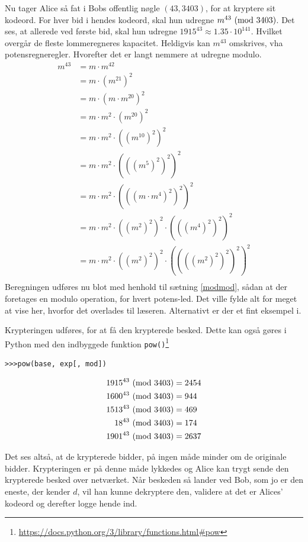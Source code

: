 Nu tager Alice så fat i Bobs offentlig nøgle \((43, 3403)\), for at kryptere sit kodeord.
For hver bid i hendes kodeord, skal hun udregne \(m^{43} \ (\mathrm{mod}\ 3403)\).
Det ses, at allerede ved første bid, skal hun udregne \(1915^{43} \approx 1.35 \cdot 10^{141}\).
Hvilket overgår de fleste lommeregneres kapacitet.
Heldigvis kan \(m^{43}\) omskrives, vha potensregneregler. Hvorefter det er langt nemmere at udregne modulo.
\begin{align*}
    m^{43} &= m \cdot m^{42}\\
    &= m \cdot (m^{21})^2\\
    &= m \cdot (m \cdot m^{20})^2\\
    &= m \cdot m^2 \cdot (m^{20})^2\\
    &= m \cdot m^2 \cdot ((m^{10})^2)^2\\
    &= m \cdot m^2 \cdot (((m^5)^2)^2)^2\\
    &= m \cdot m^2 \cdot (((m \cdot m^4)^2)^2)^2\\
    &= m \cdot m^2 \cdot ((m^2)^2)^2 \cdot (((m^4)^2)^2)^2\\
    &= m \cdot m^2 \cdot ((m^2)^2)^2 \cdot ((((m^2)^2)^2)^2)^2\\
\end{align*}
Beregningen udføres nu blot med henhold til sætning \ref{modmod}, sådan at der foretages en modulo operation, for hvert potens-led.
Det ville fylde alt for meget at vise her, hvorfor det overlades til læseren. Alternativt er der et fint eksempel i. \cite[104]{krypto}
\par
Krypteringen udføres, for at få den krypterede besked.
Dette kan også gøres i Python med den indbyggede funktion \texttt{pow()}\footnote{\url{https://docs.python.org/3/library/functions.html\#pow}}
\begin{verbatim}
>>>pow(base, exp[, mod])
\end{verbatim}

\begin{align*}
    1915^{43} \ (\mathrm{mod}\ 3403) &= 2454\\
    1600^{43} \ (\mathrm{mod}\ 3403) &= 944\\
    1513^{43} \ (\mathrm{mod}\ 3403) &= 469\\
    18^{43} \ (\mathrm{mod}\ 3403)   &= 174\\
    1901^{43} \ (\mathrm{mod}\ 3403) &= 2637\\
\end{align*}

Det ses altså, at de krypterede bidder, på ingen måde minder om de originale bidder.
Krypteringen er på denne måde lykkedes og Alice kan trygt sende den krypterede besked over netværket.
Når beskeden så lander ved Bob, som jo er den eneste, der kender \(d\), vil han kunne dekryptere den, validere at det er Alices' kodeord og derefter logge hende ind.

